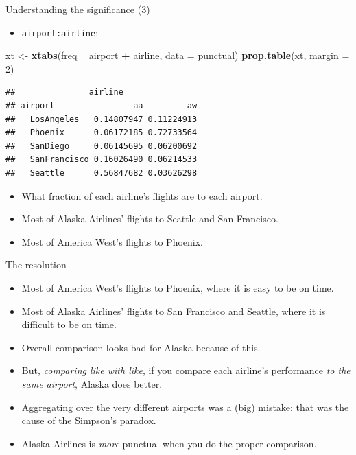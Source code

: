 \documentclass[
  ignorenonframetext,
]{beamer}
\newenvironment{Shaded}{\begin{snugshade}}{\end{snugshade}}
\newcommand{\DataTypeTok}[1]{\textcolor[rgb]{0.13,0.29,0.53}{#1}}
\newcommand{\DecValTok}[1]{\textcolor[rgb]{0.00,0.00,0.81}{#1}}
\newcommand{\KeywordTok}[1]{\textcolor[rgb]{0.13,0.29,0.53}{\textbf{#1}}}
\newcommand{\NormalTok}[1]{#1}
\newcommand{\OperatorTok}[1]{\textcolor[rgb]{0.81,0.36,0.00}{\textbf{#1}}}
\newcommand{\StringTok}[1]{\textcolor[rgb]{0.31,0.60,0.02}{#1}}
\providecommand{\tightlist}{%
  \setlength{\itemsep}{0pt}\setlength{\parskip}{0pt}}
\begin{document}
\begin{frame}[fragile]{Understanding the significance (3)}
\protect\hypertarget{understanding-the-significance-3}{}

\begin{itemize}
\tightlist
\item
  \texttt{airport:airline}:
\end{itemize}

\begin{Shaded}
\begin{Highlighting}[]
\NormalTok{xt <-}\StringTok{ }\KeywordTok{xtabs}\NormalTok{(freq }\OperatorTok{~}\StringTok{ }\NormalTok{airport }\OperatorTok{+}\StringTok{ }\NormalTok{airline, }\DataTypeTok{data =}\NormalTok{ punctual)}
\KeywordTok{prop.table}\NormalTok{(xt, }\DataTypeTok{margin =} \DecValTok{2}\NormalTok{)}
\end{Highlighting}
\end{Shaded}

\begin{verbatim}
##               airline
## airport                aa         aw
##   LosAngeles   0.14807947 0.11224913
##   Phoenix      0.06172185 0.72733564
##   SanDiego     0.06145695 0.06200692
##   SanFrancisco 0.16026490 0.06214533
##   Seattle      0.56847682 0.03626298
\end{verbatim}

\begin{itemize}
\item
  What fraction of each airline's flights are to each airport.
\item
  Most of Alaska Airlines' flights to Seattle and San Francisco.
\item
  Most of America West's flights to Phoenix.
\end{itemize}

\end{frame}

\begin{frame}{The resolution}
\protect\hypertarget{the-resolution}{}

\begin{itemize}
\item
  Most of America West's flights to Phoenix, where it is easy to be on
  time.
\item
  Most of Alaska Airlines' flights to San Francisco and Seattle, where
  it is difficult to be on time.
\item
  Overall comparison looks bad for Alaska because of this.
\item
  But, \emph{comparing like with like}, if you compare each airline's
  performance \emph{to the same airport}, Alaska does better.
\item
  Aggregating over the very different airports was a (big) mistake: that
  was the cause of the Simpson's paradox.
\item
  Alaska Airlines is \emph{more} punctual when you do the proper
  comparison.
\end{itemize}

\end{frame}
\end{document}
